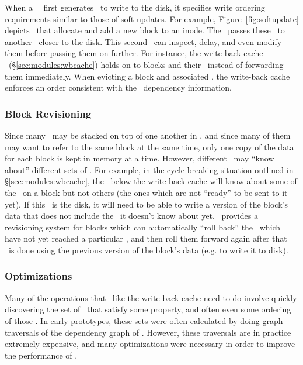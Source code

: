 When a \Kudos\ \module\ first generates \chdescs\ to write to the disk, it
specifies write ordering requirements similar to those of soft updates. For
example, Figure~\ref{fig:softupdate} depicts \chdescs\ that allocate and add a
new block to an inode. The \module\ passes these \chdescs\ to another \module\
closer to the disk. This second \module\ can inspect, delay, and even modify
them before passing them on further. For instance, the write-back cache \module\
(\S\ref{sec:modules:wbcache}) holds on to blocks and their \chdescs\ instead of
forwarding them immediately. When evicting a block and associated \chdescs, the
write-back cache enforces an order consistent with the \chdesc\ dependency
information.

\subsubsection{Block Revisioning}
Since many \modules\ may be stacked on top of one another in \Kudos, and since
many of them may want to refer to the same block at the same time, only one copy
of the data for each block is kept in memory at a time. However, different
\modules\ may ``know about'' different sets of \chdescs. For example, in the
cycle breaking situation outlined in \S\ref{sec:modules:wbcache}, the \module\
below the write-back cache will know about some of the \chdescs\ on a block but
not others (the ones which are not ``ready'' to be sent to it yet). If this
\module\ is the disk, it will need to be able to write a version of the block's
data that does not include the \chdescs\ it doesn't know about yet. \Kudos\
provides a revisioning system for blocks which can automatically ``roll back''
the \chdescs\ which have not yet reached a particular \module, and then roll
them forward again after that \module\ is done using the previous version of the
block's data (e.g. to write it to disk).

\subsubsection {Optimizations}
Many of the operations that \modules\ like the write-back cache need to do
involve quickly discovering the set of \chdescs\ that satisfy some property,
and often even some ordering of those \chdescs. In early prototypes, these sets
were often calculated by doing graph traversals of the dependency graph of
\chdescs. However, these traversals are in practice extremely expensive, and
many optimizations were necessary in order to improve the performance of
\Kudos.

